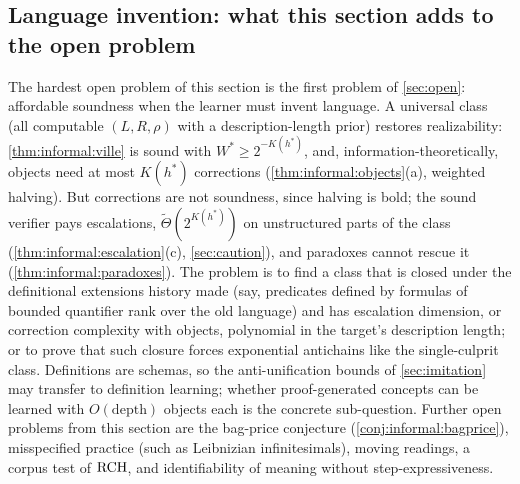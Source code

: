 \subsection{Language invention: what this section adds to the open problem}\label{app:informal:open}

The hardest open problem of this section is the first problem of \cref{sec:open}: affordable soundness when the learner must invent language. A universal class (all computable $(L,R,\rho)$ with a description-length prior) restores realizability: \cref{thm:informal:ville} is sound with $W^*\ge2^{-K(h^*)}$, and, information-theoretically, objects need at most $K(h^*)$ corrections (\cref{thm:informal:objects}(a), weighted halving). But corrections are not soundness, since halving is bold; the sound verifier pays escalations, $\tilde\Theta(2^{K(h^*)})$ on unstructured parts of the class (\cref{thm:informal:escalation}(c), \cref{sec:caution}), and paradoxes cannot rescue it (\cref{thm:informal:paradoxes}). The problem is to find a class that is closed under the definitional extensions history made (say, predicates defined by formulas of bounded quantifier rank over the old language) and has escalation dimension, or correction complexity with objects, polynomial in the target's description length; or to prove that such closure forces exponential antichains like the single-culprit class. Definitions are schemas, so the anti-unification bounds of \cref{sec:imitation} may transfer to definition learning; whether proof-generated concepts can be learned with $O(\mathrm{depth})$ objects each is the concrete sub-question. Further open problems from this section are the bag-price conjecture (\cref{conj:informal:bagprice}), misspecified practice (such as Leibnizian infinitesimals), moving readings, a corpus test of $\mathrm{RCH}$, and identifiability of meaning without step-expressiveness.
